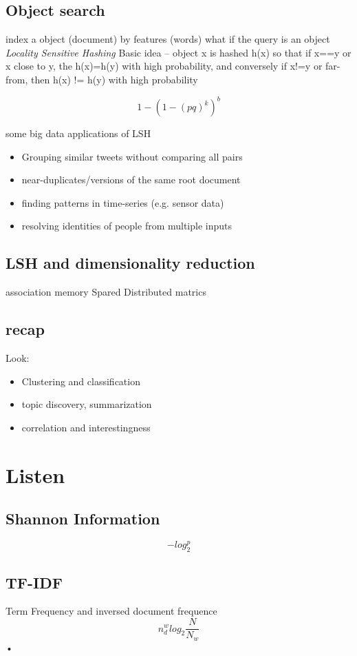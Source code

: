 \documentclass[11pt, oneside]{article}   	%
\begin{document}
\subsection{Object search}

 	index a object (document) by features (words)
	what if the query is an object
	{\it	  Locality Sensitive Hashing }
	Basic idea -- object x is hashed h(x) so that
		if x==y or x close to y, the h(x)=h(y) with high probability, and conversely
		if x!=y  or far-from, then h(x) != h(y) with high probability

	\begin{equation}
		1-(1-(pq)^{k})^b
	\end{equation}

	some big data applications of LSH
	\begin{itemize}
	\item	Grouping similar tweets without comparing all pairs
	\item near-duplicates/versions of the same root document
	\item finding patterns in time-series (e.g. sensor data)
	\item resolving identities of people from multiple inputs
	\end{itemize}

\subsection{LSH and dimensionality reduction}
	association memory
	Spared Distributed matrics

\subsection{recap}
  Look:
\begin{itemize}
\item	Clustering and classification
\item	topic discovery, summarization
\item	correlation and interestingness
\end{itemize}

\section{Listen}
\subsection{Shannon Information}
	$$-log_2^p$$
\subsection{TF-IDF}
Term Frequency and inversed document frequence
\begin{equation}
n_d^w log_2 \frac{N}{N_w}
\end{equation}•
\end{document}
